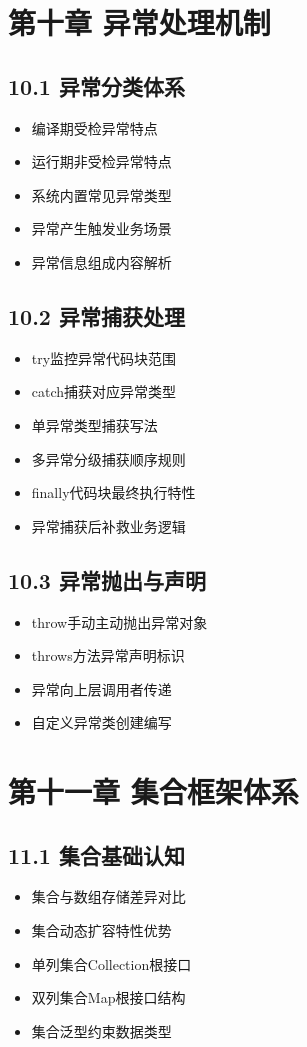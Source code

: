 \section{第十章 异常处理机制}
\subsection{10.1 异常分类体系}
\begin{itemize}
\item 编译期受检异常特点
\item 运行期非受检异常特点
\item 系统内置常见异常类型
\item 异常产生触发业务场景
\item 异常信息组成内容解析
\end{itemize}

\subsection{10.2 异常捕获处理}
\begin{itemize}
\item try监控异常代码块范围
\item catch捕获对应异常类型
\item 单异常类型捕获写法
\item 多异常分级捕获顺序规则
\item finally代码块最终执行特性
\item 异常捕获后补救业务逻辑
\end{itemize}

\subsection{10.3 异常抛出与声明}
\begin{itemize}
\item throw手动主动抛出异常对象
\item throws方法异常声明标识
\item 异常向上层调用者传递
\item 自定义异常类创建编写
\end{itemize}

\section{第十一章 集合框架体系}
\subsection{11.1 集合基础认知}
\begin{itemize}
\item 集合与数组存储差异对比
\item 集合动态扩容特性优势
\item 单列集合Collection根接口
\item 双列集合Map根接口结构
\item 集合泛型约束数据类型
\end{itemize}

